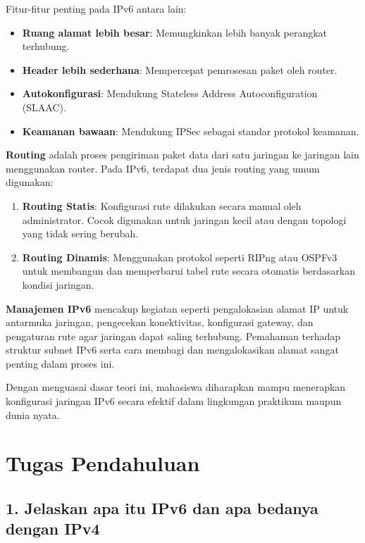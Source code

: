 Fitur-fitur penting pada IPv6 antara lain:
\begin{itemize}
    \item \textbf{Ruang alamat lebih besar}: Memungkinkan lebih banyak perangkat terhubung.
    \item \textbf{Header lebih sederhana}: Mempercepat pemrosesan paket oleh router.
    \item \textbf{Autokonfigurasi}: Mendukung Stateless Address Autoconfiguration (SLAAC).
    \item \textbf{Keamanan bawaan}: Mendukung IPSec sebagai standar protokol keamanan.
\end{itemize}

\textbf{Routing} adalah proses pengiriman paket data dari satu jaringan ke jaringan lain menggunakan router. Pada IPv6, terdapat dua jenis routing yang umum digunakan:
\begin{enumerate}
    \item \textbf{Routing Statis}: Konfigurasi rute dilakukan secara manual oleh administrator. Cocok digunakan untuk jaringan kecil atau dengan topologi yang tidak sering berubah.
    \item \textbf{Routing Dinamis}: Menggunakan protokol seperti RIPng atau OSPFv3 untuk membangun dan memperbarui tabel rute secara otomatis berdasarkan kondisi jaringan.
\end{enumerate}

\textbf{Manajemen IPv6} mencakup kegiatan seperti pengalokasian alamat IP untuk antarmuka jaringan, pengecekan konektivitas, konfigurasi gateway, dan pengaturan rute agar jaringan dapat saling terhubung. Pemahaman terhadap struktur subnet IPv6 serta cara membagi dan mengalokasikan alamat sangat penting dalam proses ini.

Dengan menguasai dasar teori ini, mahasiswa diharapkan mampu menerapkan konfigurasi jaringan IPv6 secara efektif dalam lingkungan praktikum maupun dunia nyata.


\section*{Tugas Pendahuluan}

\subsection*{1. Jelaskan apa itu IPv6 dan apa bedanya dengan IPv4}

